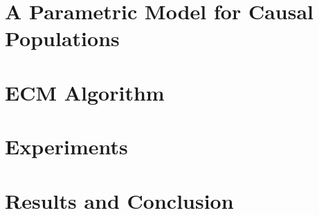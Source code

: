 \documentclass{esann}
\begin{document}
\section{A Parametric Model for Causal Populations}
\label{sec:paramModel}


\section{ECM Algorithm}


\section{Experiments}


\section{Results and Conclusion}



\begin{footnotesize}






\end{footnotesize}

\end{document}
